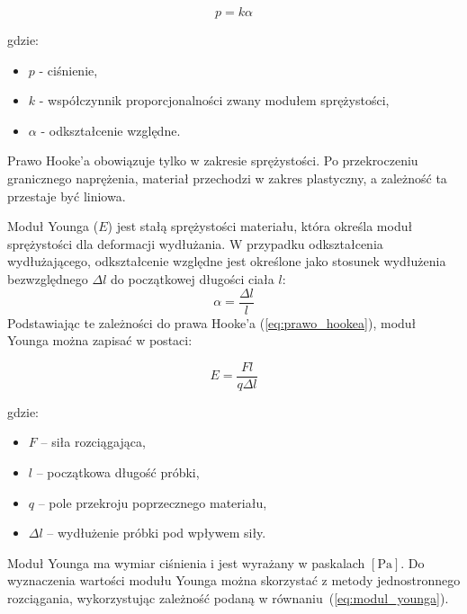 \documentclass[a4paper,12pt]{article}
\begin{document}
\begin{equation} \label{eq:prawo_hookea}
p = k\alpha
\end{equation}

gdzie:
\begin{itemize}
    \setlength{\itemsep}{0em}
    \item $p$ - ciśnienie,
    \item $k$ - współczynnik proporcjonalności zwany modułem sprężystości,
    \item $\alpha$ - odkształcenie względne.
\end{itemize}

Prawo Hooke’a obowiązuje tylko w zakresie sprężystości. Po przekroczeniu granicznego naprężenia, materiał przechodzi w zakres plastyczny, a zależność ta przestaje być liniowa.



 

Moduł Younga ($E$) jest stałą sprężystości materiału, która określa moduł sprężystości dla deformacji wydłużania. W przypadku odkształcenia wydłużającego, odkształcenie względne jest określone jako stosunek wydłużenia bezwzględnego $\Delta{l}$ do początkowej długości ciała $l$:
$$
\alpha = \frac{\Delta l}{l}
$$
Podstawiając te zależności do prawa Hooke’a (\ref{eq:prawo_hookea}), moduł Younga można zapisać w postaci:

\begin{equation} \label{eq:modul_younga}
E = \frac{Fl}{q \Delta l}
\end{equation}

gdzie:
\begin{itemize}
    \setlength{\itemsep}{0em}
    \item $F$ – siła rozciągająca,
    \item $l$ – początkowa długość próbki,
    \item $q$ – pole przekroju poprzecznego materiału,
    \item $\Delta l$ – wydłużenie próbki pod wpływem siły.
\end{itemize}
Moduł Younga ma wymiar ciśnienia i jest wyrażany w paskalach $[\text{Pa}]$.
Do wyznaczenia wartości modułu Younga można skorzystać z metody jednostronnego rozciągania, wykorzystując zależność podaną w równaniu~(\ref{eq:modul_younga}).
\end{document}
